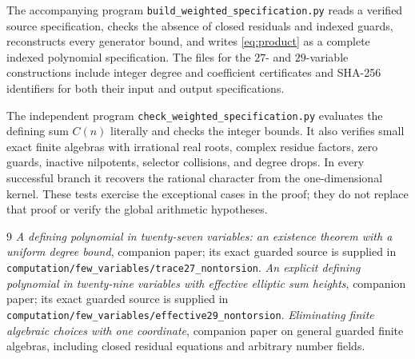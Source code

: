 \documentclass[11pt,a4paper]{article}
\begin{document}
The accompanying program \texttt{build\_weighted\_specification.py}
reads a verified source specification, checks the absence of closed
residuals and indexed guards, reconstructs every generator bound,
and writes \eqref{eq:product} as a complete indexed polynomial
specification. The files for the $27$- and $29$-variable constructions
include integer degree and coefficient certificates and SHA-256
identifiers for both their input and output specifications.

The independent program \texttt{check\_weighted\_specification.py}
evaluates the defining sum $C(n)$ literally and checks the integer
bounds. It also verifies small exact finite algebras with irrational
real roots, complex residue factors, zero guards, inactive nilpotents,
selector collisions, and degree drops. In every successful branch
it recovers the rational character from the one-dimensional kernel.
These tests exercise the exceptional cases in the proof; they do
not replace that proof or verify the global arithmetic hypotheses.

\begin{thebibliography}{9}
\emph{A defining polynomial in twenty-seven variables:
an existence theorem with a uniform degree bound},
companion paper; its exact guarded source is supplied in
\texttt{computation/few\_variables/trace27\_nontorsion}.
\emph{An explicit defining polynomial in twenty-nine variables
with effective elliptic sum heights},
companion paper; its exact guarded source is supplied in
\texttt{computation/few\_variables/effective29\_nontorsion}.
\emph{Eliminating finite algebraic choices with one coordinate},
companion paper on general guarded finite algebras, including
closed residual equations and arbitrary number fields.
\end{thebibliography}
\end{document}
